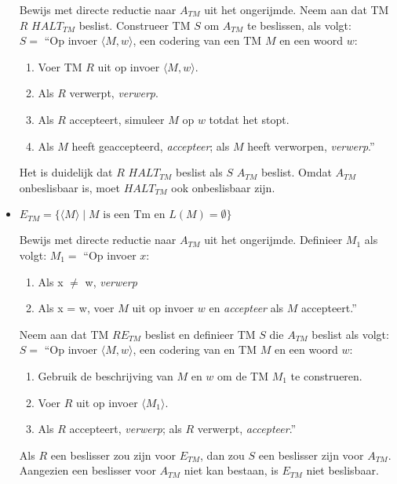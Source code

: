 \documentclass[]{article}
\begin{document}
\begin{itemize}
	Bewijs met directe reductie naar $A_{TM}$ uit het ongerijmde.
	Neem aan dat TM $R$ $HALT_{TM}$ beslist. Construeer TM $S$ om $A_{TM}$ te beslissen, als volgt: \\
	$S = $ ``Op invoer $\langle M, w \rangle$, een codering van een TM $M$ en een woord $w$:
	\begin{enumerate}
		\item Voer TM $R$ uit op invoer $\langle M, w \rangle$.
		\item Als $R$ verwerpt, \emph{verwerp}.
		\item Als $R$ accepteert, simuleer $M$ op $w$ totdat het stopt.
		\item Als $M$ heeft geaccepteerd, \emph{accepteer}; als $M$ heeft verworpen, \emph{verwerp}.''
	\end{enumerate}
	Het is duidelijk dat $R$ $HALT_{TM}$ beslist als $S$ $A_{TM}$ beslist. Omdat $A_{TM}$ onbeslisbaar is, moet $HALT_{TM}$ ook onbeslisbaar zijn.
	
	
	\item $E_{TM} = \{ \langle M \rangle \mid M \mbox{ is een Tm en } L(M) = \emptyset \}$
	
	Bewijs met directe reductie naar $A_{TM}$ uit het ongerijmde.	
	Definieer $M_1$ als volgt:
	$M_1 = $ ``Op invoer $x$: \\
	\begin{enumerate}
		\item Als x $\neq$ w, \emph{verwerp}
		\item Als x = w, voer $M$ uit op invoer $w$ en \emph{accepteer} als $M$ accepteert.''
	\end{enumerate}
	
	Neem aan dat TM $R E_{TM}$ beslist en definieer TM $S$ die $A_{TM}$ beslist als volgt: \\
	$S = $ ``Op invoer $\langle M, w \rangle$, een codering van en TM $M$ en een woord $w$:
	\begin{enumerate}
		\item	 Gebruik de beschrijving van $M$ en $w$ om de TM $M_1$ te construeren.
		\item Voer $R$ uit op invoer $\langle M_1 \rangle$.
		\item Als $R$ accepteert, \emph{verwerp}; als $R$ verwerpt, \emph{accepteer}.''
	\end{enumerate}
	Als $R$ een beslisser zou zijn voor $E_{TM}$, dan zou $S$ een beslisser zijn voor $A_{TM}$. Aangezien een beslisser voor $A_{TM}$ niet kan bestaan, is $E_{TM}$ niet beslisbaar.
	

\end{itemize}
\end{document}
